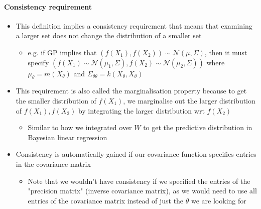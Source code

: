 \documentclass[12pt]{article}
\begin{document}
\paragraph{Consistency requirement}
\begin{itemize}
    \item This definition implies a consistency requirement that means that examining a larger set does not change the distribution of a smaller set
        \begin{itemize}
            \item e.g. if GP implies that $(f(X_1), f(X_2)) \sim \mathcal{N}(\mu, \Sigma)$, then it must specify $(f(X_1) \sim \mathcal{N}(\mu_1, \Sigma), f(X_2) \sim \mathcal{N}(\mu_2, \Sigma))$ where $\mu_{\theta} = m(X_{\theta})$ and $\Sigma_{\theta\theta} = k(X_{\theta}, X_{\theta})$
        \end{itemize}
    \item This requirement is also called the marginalisation property because to get the smaller distribution of $f(X_1)$, we marginalise out the larger distribution of $f(X_1), f(X_2)$ by integrating the larger distribution wrt $f(X_2)$
        \begin{itemize}
            \item Similar to how we integrated over $W$ to get the predictive distribution in Bayesian linear regression
        \end{itemize}
    \item Consistency is automatically gained if our covariance function specifies entries in the covariance matrix
        \begin{itemize}
            \item Note that we wouldn't have consistency if we specified the entries of the "precision matrix" (inverse covariance matrix), as we would need to use all entries of the covariance matrix instead of just the $\theta$ we are looking for
        \end{itemize}
\end{itemize}
\end{document}
